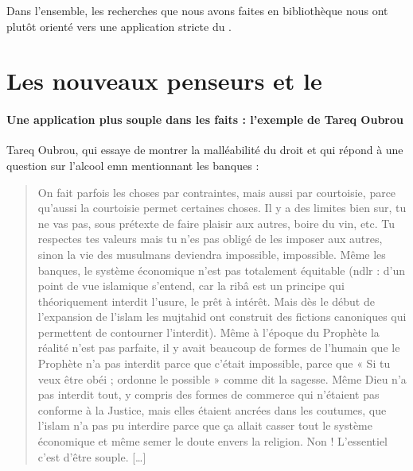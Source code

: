  Dans l'ensemble, les recherches que nous avons faites en bibliothèque nous ont plutôt orienté vers une application stricte du \riba. 
 
\section{Les nouveaux penseurs et le \riba}
 \paragraph{Une application plus souple dans les faits : l'exemple de Tareq Oubrou} Tareq Oubrou, qui essaye de montrer la malléabilité du droit et qui répond à une question sur l'alcool emn mentionnant les banques : 
 \begin{quote}
    On fait parfois les choses par contraintes, mais aussi par courtoisie, parce qu’aussi la courtoisie permet certaines choses. Il y a des limites bien sur, tu ne vas pas, sous prétexte de faire plaisir aux autres, boire du vin, etc. Tu respectes tes valeurs mais tu n’es pas obligé de les imposer aux autres, sinon la vie des musulmans deviendra impossible, impossible. Même les banques, le système économique n’est pas totalement équitable (ndlr : d’un point de vue islamique s’entend, car la ribâ est un principe qui théoriquement interdit l’usure, le prêt à intérêt. Mais dès le début de l’expansion de l’islam les mujtahid ont construit des fictions canoniques qui permettent de contourner l’interdit). Même à l’époque du Prophète la réalité n’est pas parfaite, il y avait beaucoup de formes de l’humain que le Prophète n’a pas interdit parce que c’était impossible, parce que « Si tu veux être obéi ; ordonne le possible » comme dit la sagesse. Même Dieu n’a pas interdit tout, y compris des formes de commerce qui n’étaient pas conforme à la Justice, mais elles étaient ancrées dans les coutumes, que l’islam n’a pas pu interdire parce que ça allait casser tout le système économique et même semer le doute envers la religion. Non ! L’essentiel c’est d’être souple. […]  
 \end{quote}



